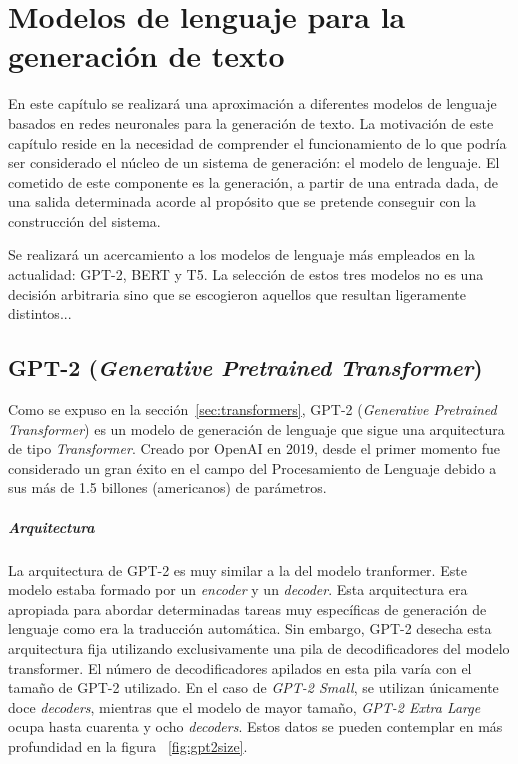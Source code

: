 \chapter{Modelos de lenguaje para la generación de texto}
\label{cap:ML_nlg}

En este capítulo se realizará una aproximación a  diferentes modelos de lenguaje basados en redes neuronales para la generación de texto. La motivación de este capítulo reside en la necesidad de comprender el funcionamiento de lo que podría ser considerado el núcleo de un sistema de generación: el modelo de lenguaje.
El cometido de este componente es la generación, a partir de una entrada dada, de una salida determinada acorde al propósito que se pretende conseguir con la construcción del sistema. 

Se realizará un acercamiento a los modelos de lenguaje más empleados en la actualidad: GPT-2, BERT y T5. La selección de estos tres modelos no es una decisión arbitraria sino que se escogieron aquellos que resultan ligeramente distintos... %

\section{GPT-2 (\textit{Generative Pretrained Transformer})}
Como se expuso en la sección~\ref{sec:transformers}, GPT-2 (\textit{Generative Pretrained Transformer}) es un modelo de generación de lenguaje que sigue una arquitectura de tipo \textit{Transformer}. Creado por OpenAI en 2019, desde el primer momento fue considerado un gran éxito en el campo del Procesamiento de Lenguaje debido a sus más de 1.5 billones (americanos) de parámetros.

\paragraph{Arquitectura}\hfill


La arquitectura de GPT-2 es muy similar a la del modelo tranformer. Este modelo estaba formado por un \textit{encoder} y un \textit{decoder}. Esta arquitectura era apropiada para abordar determinadas tareas muy específicas de generación de lenguaje como era la traducción automática. Sin embargo, GPT-2 desecha esta arquitectura fija utilizando exclusivamente una pila de decodificadores del modelo transformer. El número de decodificadores apilados en esta pila varía con el tamaño de GPT-2 utilizado. En el caso de \textit{GPT-2 Small}, se utilizan únicamente doce \textit{decoders}, mientras que el modelo de mayor tamaño, \textit{GPT-2 Extra Large} ocupa hasta cuarenta y ocho \textit{decoders}. Estos datos se pueden contemplar en más profundidad en la figura ~\ref{fig:gpt2size}.



